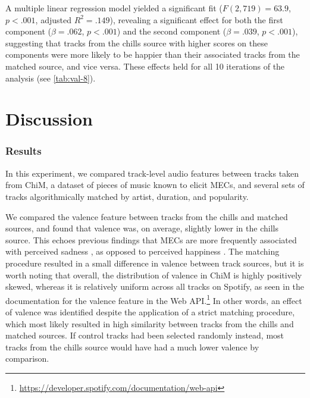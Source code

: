 

A multiple linear regression model yielded a significant fit ($F(2, 719) = 63.9$, $p < .001$, adjusted $R^2 = .149$), revealing a significant effect for both the first component ($\beta = .062$, $p < .001$) and the second component ($\beta = .039$, $p < .001$), suggesting that tracks from the chills source with higher scores on these components were more likely to be happier than their associated tracks from the matched source, and vice versa. These effects held for all 10 iterations of the analysis (see \autoref{tab:val-8}).



\section{Discussion}
\label{se:val-discussion}

\subsubsection{Results}

In this experiment, we compared track-level audio features between tracks taken from ChiM, a dataset of pieces of music known to elicit MECs, and several sets of tracks algorithmically matched by artist, duration, and popularity.

We compared the valence feature between tracks from the chills and matched sources, and found that valence was, on average, slightly lower in the chills source. This echoes previous findings that MECs are more frequently associated with perceived sadness \parencite{panksepp1995}, as opposed to perceived happiness \parencite{grewe2011}. The matching procedure resulted in a small difference in valence between track sources, but it is worth noting that overall, the distribution of valence in ChiM is highly positively skewed, whereas it is relatively uniform across all tracks on Spotify, as seen in the documentation for the valence feature in the Web API.\footnote{\url{https://developer.spotify.com/documentation/web-api}} In other words, an effect of valence was identified despite the application of a strict matching procedure, which most likely resulted in high similarity between tracks from the chills and matched sources. If control tracks had been selected randomly instead, most tracks from the chills source would have had a much lower valence by comparison.

